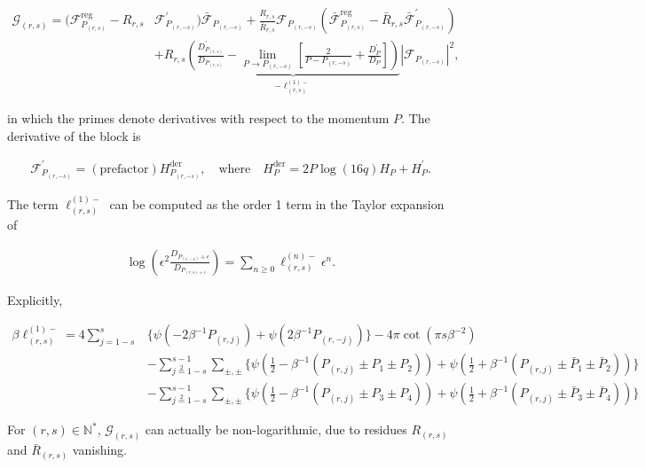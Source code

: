 \documentclass[a4paper]{article}
\numberwithin{equation}{section}
\begin{document}
\begin{align}\label{eq:log_block}
\mathcal{G}_{(r,s)} = (\mathcal{F}_{P_{(r,s)}}^{\text{reg}} - R_{r,s}& \mathcal{F}^{'}_{P_{(r,-s)}}) \bar{\mathcal{F}}_{P_{(r,-s)}} + \frac{R_{r,s}}{\bar R_{r,s}} \mathcal{F}_{P_{(r,-s)}} (\bar{\mathcal{F}}_{P_{(r,s)}}^{\text{reg}} - \bar{R}_{r,s} \bar{\mathcal{F}}^{'}_{P_{(r,-s)}})\nonumber \\
& +R_{r,s} \underbrace{\left( \frac{D^{'}_{P_{(r,s)}}}{D_{P_{(r,s)}}} - \lim_{P \to P_{(r,-s)}} \left[ \frac{2}{P-P_{(r,-s)}} + \frac{D_{P}^{'}}{D_{P}} \right] \right)}_{-\ell^{(1)-}_{(r,s)}}\left|\mathcal{F}_{P_{(r,-s)}}\right|^{2},
\end{align}

in which the primes denote derivatives with respect to the momentum \(P\). The derivative of the block is

\begin{align}
  \mathcal{F}_{P_{(r,-s)}}^{'} = (\text{prefactor}) H^{\text{der}}_{P_{(r,-s)}}, \quad \text{where} \quad H^{\text{der}}_{P} = 2P\log(16q) H_{P} + H_{P}^{'}.
\end{align}

The term \(\ell^{(1)-}_{(r,s)}\) can be computed as the order 1 term in the Taylor expansion of

\begin{align}
  \log \left( \epsilon^{2} \frac{D_{P_{(r,-s)}+\epsilon}}{D_{P_{(r,s)+\epsilon}}} \right) = \sum_{n\geq 0} \ell^{(n)-}_{(r,s)} \epsilon^{n}.
\end{align}

Explicitly,

\begin{align}
 \beta\ell^{(1)-}_{(r,s)} = 4\sum_{j=1-s}^s &\Big\{ \psi(-2\beta^{-1}P_{(r,j)}) +\psi(2\beta^{-1}P_{( r,-j)}) \Big\}
 -4\pi \cot(\pi s \beta^{-2})
 \\
 &-\sum_{j\overset{2}{=}1-s}^{s-1}\sum_{\pm,\pm}\Big\{
 \psi\left(\tfrac12-\beta^{-1}(P_{( r,j)}\pm P_1\pm P_2)\right)
 + \psi\left(\tfrac12+\beta^{-1}(P_{( r,j)}\pm \bar P_1\pm \bar P_2)\right)
 \Big\}
 \\
 &-\sum_{j\overset{2}{=}1-s}^{s-1}\sum_{\pm,\pm}\Big\{
 \psi\left(\tfrac12-\beta^{-1}(P_{( r,j)}\pm P_3\pm P_4)\right)
 + \psi\left(\tfrac12+\beta^{-1}(P_{( r,j)}\pm \bar P_3\pm \bar P_4)\right)
 \Big\}
\end{align}

For \((r, s) \in \mathbb{N}^{*}\), \(\mathcal G_{(r,s)}\) can actually be non-logarithmic, due to residues \(R_{(r,s)}\) and \(\bar R_{(r,s)}\) vanishing.
\end{document}
